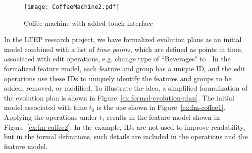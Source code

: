 \begin{figure}
   \begin{center}
      \texttt{[image: CoffeeMachine2.pdf]}
   \end{center}
   \caption[Coffee machine with added touch interface]{Coffee machine with added touch interface \footnotemark}
   \label{ex:fm-coffee2}
\end{figure}


In the LTEP research project, we have formalized evolution plans as an initial model combined with a list of \emph{time points}, which are defined as points in time, associated with edit operations, e.g. change type of ``Beverages" to \optional{}. In the formalized feature model, each feature and group has a unique ID, and the edit operations use these IDs to uniquely identify the features and groups to be added, removed, or modified. To illustrate the idea, a simplified formalization of the evolution plan is shown in Figure~\vref{ex:formal-evolution-plan}. The initial model associated with time $t_0$ is the one shown in Figure~\vref{ex:fm-coffee1}. Applying the operations under $t_1$ results in the feature model shown in Figure~\vref{ex:fm-coffee2}. In the example, IDs are not used to improve readability, but in the formal definitions, such details are included in the operations and the feature model. 

